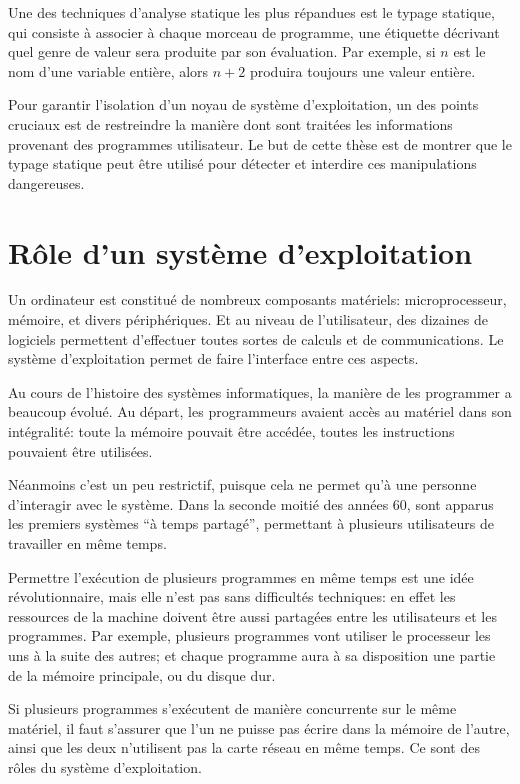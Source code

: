 Une des techniques d'analyse statique les plus répandues est le typage statique,
qui consiste %
à associer à chaque morceau de programme, une étiquette
décrivant quel genre de valeur sera produite par son évaluation. Par exemple, si
$n$ est le nom d'une variable entière, alors $n + 2$ produira toujours une
valeur entière.

Pour garantir l'isolation d'un noyau de système d'exploitation, un des points
cruciaux est de restreindre la manière dont sont traitées les informations
provenant des programmes utilisateur. Le but de cette thèse est de montrer que
le typage statique peut être utilisé pour détecter et interdire ces
manipulations dangereuses.


\section{Rôle d'un système d'exploitation}

Un ordinateur est constitué de nombreux composants matériels: microprocesseur,
mémoire, et divers périphériques. Et au niveau de l'utilisateur, des dizaines de
logiciels permettent d'effectuer toutes sortes de calculs et de communications.
Le système d'exploitation permet de faire l'interface entre ces aspects.

Au cours de l'histoire des systèmes informatiques, la manière de les programmer
a beaucoup évolué. Au départ, les programmeurs avaient accès au matériel dans
son intégralité: toute la mémoire pouvait être accédée, toutes les instructions
pouvaient être utilisées.

Néanmoins c'est un peu restrictif, puisque cela ne permet qu'à une personne
d'interagir avec le système. Dans la seconde moitié des années 60, sont apparus
les premiers systèmes ``à temps partagé'', permettant à plusieurs utilisateurs
de travailler en même temps.

Permettre l'exécution de plusieurs programmes en même temps est une idée
révolutionnaire, mais elle n'est pas sans difficultés techniques: en effet les
ressources de la machine doivent être aussi partagées entre les utilisateurs et
les programmes. Par exemple, plusieurs programmes vont utiliser le processeur
les uns à la suite des autres; et chaque programme aura à sa disposition une
partie de la mémoire principale, ou du disque dur.

Si plusieurs programmes s'exécutent de manière concurrente sur le même matériel,
il faut s'assurer que l'un ne puisse pas écrire dans la mémoire de l'autre,
ainsi que les deux n'utilisent pas la carte réseau en même temps. Ce sont des
rôles du système d'exploitation.

